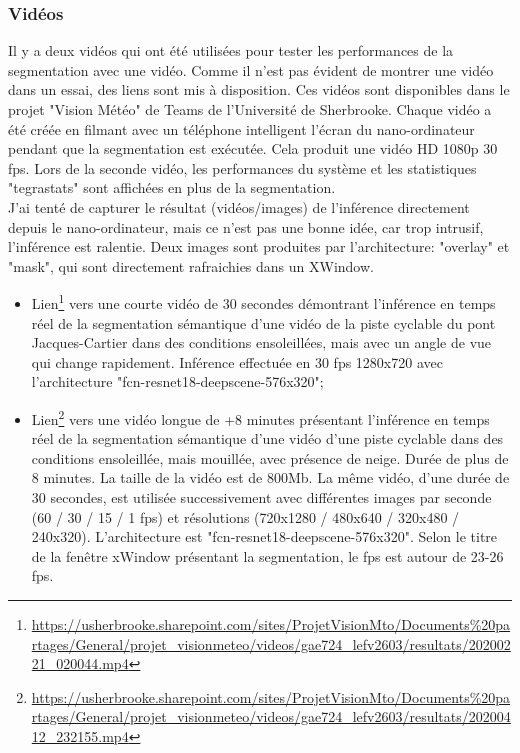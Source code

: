 \subsubsection{Vidéos}
\noindent Il y a deux vidéos qui ont été utilisées pour tester les performances de la segmentation avec une vidéo. Comme il n'est pas évident de montrer une vidéo dans un essai, des liens sont mis à disposition. Ces vidéos sont disponibles dans le projet "Vision Météo" de Teams de l'Université de Sherbrooke. Chaque vidéo a été créée en filmant avec un téléphone intelligent l'écran du nano-ordinateur pendant que la segmentation est exécutée. Cela produit une vidéo HD 1080p 30 \acrshort{fps}. Lors de la seconde vidéo, les performances du système et les statistiques "tegrastats" sont affichées en plus de la segmentation.
\vspace{0.5\baselineskip}
\\
\noindent J'ai tenté de capturer le résultat (vidéos/images) de l'inférence directement depuis le nano-ordinateur, mais ce n'est pas une bonne idée, car trop intrusif, l'inférence est ralentie. Deux images sont produites par l'architecture: "overlay" et "mask", qui sont directement rafraichies dans un XWindow. 
\begin{itemize}
   \item Lien\footnote{\url{https://usherbrooke.sharepoint.com/sites/ProjetVisionMto/Documents\%20partages/General/projet_visionmeteo/videos/gae724_lefv2603/resultats/20200221_020044.mp4}} vers une courte vidéo de 30 secondes démontrant l'inférence en temps réel de la segmentation sémantique d'une vidéo de la piste cyclable du pont Jacques-Cartier dans des conditions ensoleillées, mais avec un angle de vue qui change rapidement. Inférence effectuée en 30 \acrshort{fps} 1280x720 avec l'architecture "fcn-resnet18-deepscene-576x320";
   \item Lien\footnote{\url{https://usherbrooke.sharepoint.com/sites/ProjetVisionMto/Documents\%20partages/General/projet_visionmeteo/videos/gae724_lefv2603/resultats/20200412_232155.mp4}} vers une vidéo longue de +8 minutes présentant l'inférence en temps réel de la segmentation sémantique d'une vidéo d'une piste cyclable dans des conditions ensoleillée, mais mouillée, avec présence de neige. Durée de plus de 8 minutes. La taille de la vidéo est de 800Mb. La même vidéo, d'une durée de 30 secondes, est utilisée successivement avec différentes images par seconde (60 / 30 / 15 / 1 \acrshort{fps}) et résolutions (720x1280 / 480x640 / 320x480 / 240x320). L'architecture est "fcn-resnet18-deepscene-576x320". Selon le titre de la fenêtre xWindow présentant la segmentation, le \acrshort{fps} est autour de 23-26 \acrshort{fps}.
\end{itemize}
